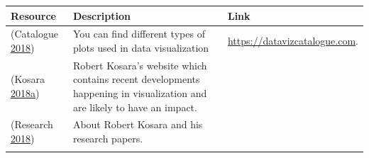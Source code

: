 \documentclass[]{book}
\begin{document}
\begin{longtable}[]{@{}lll@{}}
\toprule
\begin{minipage}[b]{0.07\columnwidth}\raggedright
\textbf{Resource}\strut
\end{minipage} & \begin{minipage}[b]{0.77\columnwidth}\raggedright
\textbf{Description}\strut
\end{minipage} & \begin{minipage}[b]{0.07\columnwidth}\raggedright
\textbf{Link}\strut
\end{minipage}\tabularnewline
\midrule
\endhead
\begin{minipage}[t]{0.07\columnwidth}\raggedright
(Catalogue \protect\hyperlink{ref-charts_viz}{2018})\strut
\end{minipage} & \begin{minipage}[t]{0.77\columnwidth}\raggedright
You can find different types of plots used in data visualization\strut
\end{minipage} & \begin{minipage}[t]{0.07\columnwidth}\raggedright
\href{https://datavizcatalogue.com/search.html}{https://datavizcatalogue.com}.\strut
\end{minipage}\tabularnewline
\begin{minipage}[t]{0.07\columnwidth}\raggedright
(Kosara \protect\hyperlink{ref-eagereyes_viz}{2018}\protect\hyperlink{ref-eagereyes_viz}{a})\strut
\end{minipage} & \begin{minipage}[t]{0.77\columnwidth}\raggedright
Robert Kosara's website which contains recent developments happening in visualization and are likely to have an impact.\strut
\end{minipage} & \begin{minipage}[t]{0.07\columnwidth}\raggedright
\strut
\end{minipage}\tabularnewline
\begin{minipage}[t]{0.07\columnwidth}\raggedright
(Research \protect\hyperlink{ref-research_viz}{2018})\strut
\end{minipage} & \begin{minipage}[t]{0.77\columnwidth}\raggedright
About Robert Kosara and his research papers.\strut
\end{minipage} & \begin{minipage}[t]{0.07\columnwidth}\raggedright
\strut
\end{minipage}\tabularnewline
\begin{minipage}[t]{0.07\columnwidth}\raggedright

\end{minipage}
\end{longtable}
\end{document}
